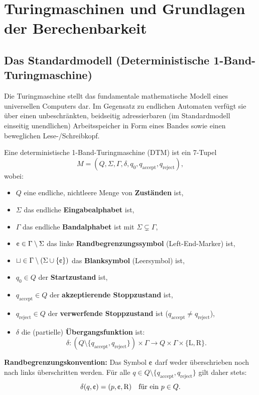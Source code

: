 \section{Turingmaschinen und Grundlagen der Berechenbarkeit}

\subsection{Das Standardmodell (Deterministische 1-Band-Turingmaschine)}

Die Turingmaschine stellt das fundamentale mathematische Modell eines universellen Computers dar. Im Gegensatz zu endlichen Automaten verfügt sie über einen unbeschränkten, beidseitig adressierbaren (im Standardmodell einseitig unendlichen) Arbeitsspeicher in Form eines Bandes sowie einen beweglichen Lese-/Schreibkopf.

\begin{definition}
    Eine deterministische 1-Band-Turingmaschine (DTM) ist ein 7-Tupel
    \[
        M = (Q, \Sigma, \Gamma, \delta, q_0, q_{\mathrm{accept}}, q_{\mathrm{reject}}),
    \]
    wobei:
    \begin{itemize}
        \item $Q$ eine endliche, nichtleere Menge von \textbf{Zuständen} ist,
        \item $\Sigma$ das endliche \textbf{Eingabealphabet} ist,
        \item $\Gamma$ das endliche \textbf{Bandalphabet} ist mit $\Sigma \subsetneq \Gamma$,
        \item $\text{\textcent} \in \Gamma \setminus \Sigma$ das linke \textbf{Randbegrenzungssymbol} (Left-End-Marker) ist,
        \item $\sqcup \in \Gamma \setminus (\Sigma \cup \{\text{\textcent}\})$ das \textbf{Blanksymbol} (Leersymbol) ist,
        \item $q_0 \in Q$ der \textbf{Startzustand} ist,
        \item $q_{\mathrm{accept}} \in Q$ der \textbf{akzeptierende Stoppzustand} ist,
        \item $q_{\mathrm{reject}} \in Q$ der \textbf{verwerfende Stoppzustand} ist ($q_{\mathrm{accept}} \neq q_{\mathrm{reject}}$),
        \item $\delta$ die (partielle) \textbf{Übergangsfunktion} ist:
        \[
            \delta : (Q \setminus \{q_{\mathrm{accept}}, q_{\mathrm{reject}}\}) \times \Gamma \to Q \times \Gamma \times \{\mathrm{L}, \mathrm{R}\}.
        \]
    \end{itemize}
    \textbf{Randbegrenzungskonvention:} Das Symbol $\text{\textcent}$ darf weder überschrieben noch nach links überschritten werden. Für alle $q \in Q \setminus \{q_{\mathrm{accept}}, q_{\mathrm{reject}}\}$ gilt daher stets:
    \[
        \delta(q, \text{\textcent}) = (p, \text{\textcent}, \mathrm{R}) \quad \text{für ein } p \in Q.
    \]
\end{definition}

